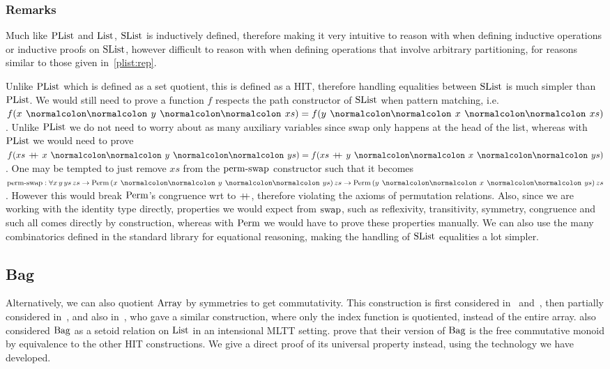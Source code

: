 \subsubsection*{Remarks}\label{slist:rep}
Much like $\PList$ and $\List$, $\SList$ is inductively defined, therefore making it very intuitive to reason
with when defining inductive operations or inductive proofs on $\SList$, however difficult to reason with
when defining operations that involve arbitrary partitioning, for reasons similar to those given
in~\cref{plist:rep}.
\begin{toappendix}
    Unlike $\PList$ which is defined as a set quotient, this is defined as a HIT, therefore handling equalities
    between $\SList$ is much simpler than $\PList$. We would still need to prove a function $f$ respects
    the path constructor of $\SList$ when pattern matching, i.e. $f(x \cons y \cons xs) = f(y \cons x \cons xs)$.
    Unlike $\PList$ we do not need to worry about as many auxiliary variables since swap
    only happens at the head of the list, whereas with $\PList$ we would need to prove
    $f(xs\,\concat\,x \cons y \cons ys) = f(xs\,\concat\,y \cons x \cons ys)$. One may be tempted to just remove $xs$
    from the $\term{perm-swap}$ constructor such that it becomes
    $\term{perm-swap} : \forall x\,y\,ys\,zs \to \Perm\,(x \cons y \cons ys)\,zs \to \Perm\,(y \cons x \cons ys)\,zs$.
    However this would break $\Perm$'s congruence wrt to $\mathbin{+\kern -0.4em+}$, therefore violating the axioms of
    permutation relations. Also, since we are working with the identity type directly, properties we would
    expect from $\term{swap}$, such as reflexivity, transitivity, symmetry, congruence and such all comes directly by
    construction, whereas with $\Perm$ we would have to prove these properties manually.
    We can also use the many combinatorics defined in the standard library for equational reasoning,
    making the handling of $\SList$ equalities a lot simpler.
\end{toappendix}

\subsection{Bag}\label{cmon:bag}
Alternatively, we can also quotient $\Array$ by symmetries to get commutativity.
%
This construction is first considered in~\cite{altenkirchDefinableQuotientsType2011}
and~\cite{liQuotientTypesType2015}, then partially considered in~\cite{choudhuryFreeCommutativeMonoids2023},
and also in~\cite{joramConstructiveFinalSemantics2023},
who gave a similar construction, where only the index function is quotiented, instead of
the entire array.
%
\cite{danielssonBagEquivalenceProofRelevant2012} also considered $\Bag$ as a setoid relation
on $\List$ in an intensional MLTT setting.
%
\cite{joramConstructiveFinalSemantics2023} prove that their version of $\Bag$
is the free commutative monoid by equivalence to the other HIT constructions.
%
We give a direct proof of its universal property instead, using the technology we have developed.

